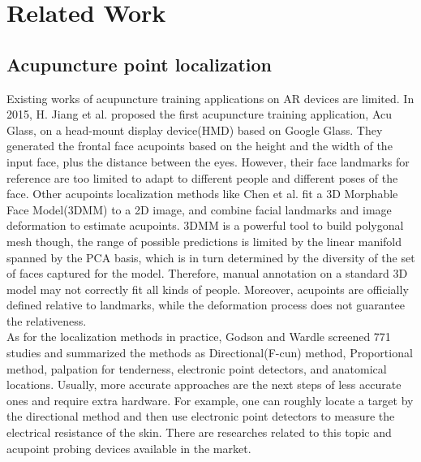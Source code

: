 \section{Related Work}
\label{sec:related-work}
\subsection{Acupuncture point localization}
\label{sec:related-acu-localize}
Existing works of acupuncture training applications on AR devices are limited. In 2015, H. Jiang et al.\cite{li2015acupoint} proposed the first acupuncture training application, Acu Glass, on a head-mount display device(HMD) based on Google Glass. They generated the frontal face acupoints based on the height and the width of the input face, plus the distance between the eyes. However, their face landmarks for reference are too limited to adapt to different people and different poses of the face. Other acupoints localization methods like Chen et al.\cite{chen2017localization}\cite{lan2018toward} fit a 3D Morphable Face Model(3DMM)\cite{huber2016multiresolution} to a 2D image, and combine facial landmarks and image deformation to estimate acupoints. 3DMM is a powerful tool to build polygonal mesh though, the range of possible predictions is limited by the linear manifold spanned by the PCA basis, which is in turn determined by the diversity of the set of faces captured for the model\cite{kartynnik2019real}. Therefore, manual annotation on a standard 3D model may not correctly fit all kinds of people. Moreover, acupoints are officially defined relative to landmarks, while the deformation process does not guarantee the relativeness.\\
As for the localization methods in practice, Godson and Wardle\cite{godson2019accuracy} screened 771 studies and summarized the methods as Directional(F-cun) method, Proportional method, palpation for tenderness, electronic point detectors, and anatomical locations. Usually, more accurate approaches are the next steps of less accurate ones and require extra hardware. For example, one can roughly locate a target by the directional method and then use electronic point detectors to measure the electrical resistance of the skin. There are researches related to this topic and acupoint probing devices available in the market.
